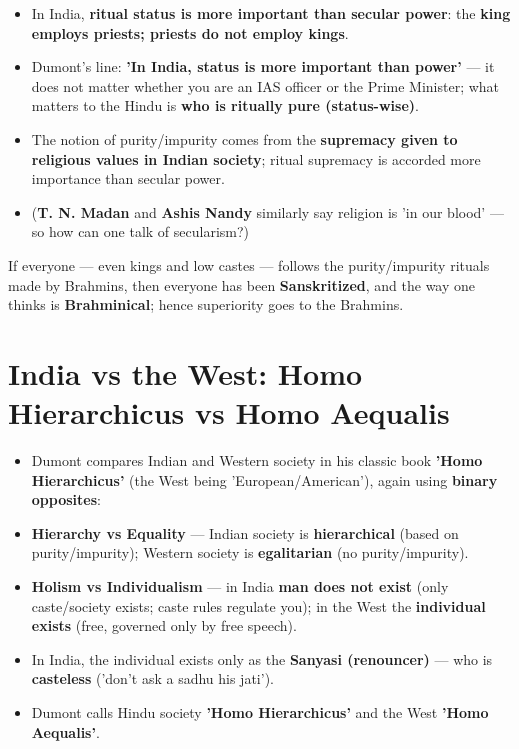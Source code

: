 \begin{KeyConcept}
\begin{itemize}
\item In India, \textbf{ritual status is more important than secular power}: the \textbf{king employs priests; priests do not employ kings}.
\item Dumont's line: \textbf{'In India, status is more important than power'} --- it does not matter whether you are an IAS officer or the Prime Minister; what matters to the Hindu is \textbf{who is ritually pure (status-wise)}.
\item The notion of purity/impurity comes from the \textbf{supremacy given to religious values in Indian society}; ritual supremacy is accorded more importance than secular power.
\item (\textbf{T. N. Madan} and \textbf{Ashis Nandy} similarly say religion is 'in our blood' --- so how can one talk of secularism?)
\end{itemize}
\end{KeyConcept}

\begin{KeyConcept}
If everyone --- even kings and low castes --- follows the purity/impurity rituals made by Brahmins, then everyone has been \textbf{Sanskritized}, and the way one thinks is \textbf{Brahminical}; hence superiority goes to the Brahmins.
\end{KeyConcept}

\section{India vs the West: Homo Hierarchicus vs Homo Aequalis}

\begin{KeyConcept}
\begin{itemize}
\item Dumont compares Indian and Western society in his classic book \textbf{'Homo Hierarchicus'} (the West being 'European/American'), again using \textbf{binary opposites}:
\item \textbf{Hierarchy vs Equality} --- Indian society is \textbf{hierarchical} (based on purity/impurity); Western society is \textbf{egalitarian} (no purity/impurity).
\item \textbf{Holism vs Individualism} --- in India \textbf{man does not exist} (only caste/society exists; caste rules regulate you); in the West the \textbf{individual exists} (free, governed only by free speech).
\item In India, the individual exists only as the \textbf{Sanyasi (renouncer)} --- who is \textbf{casteless} ('don't ask a sadhu his jati').
\item Dumont calls Hindu society \textbf{'Homo Hierarchicus'} and the West \textbf{'Homo Aequalis'}.
\end{itemize}
\end{KeyConcept}


